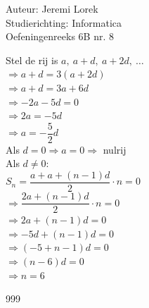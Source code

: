 \documentclass[a4paper]{article}
\begin{document}
\noindent \large Auteur: Jeremi Lorek\\
\noindent \large Studierichting: Informatica\\
\noindent \large Oefeningenreeks 6B nr. 8\\

\medskip
\normalsize

Stel de rij is $a,\ a + d,\ a + 2d,\ \dots$ \\

$\Rightarrow a + d = 3(a + 2d)$ \\

$\Rightarrow a + d = 3a + 6d$ \\

$\Rightarrow -2a - 5d = 0$ \\

$\Rightarrow 2a = -5d$ \\

$\Rightarrow a = -\dfrac{5}{2}d$ \\

Als $d = 0 \Rightarrow a = 0 \Rightarrow$ nulrij \\

Als $d \neq 0:$ \\

$S_n = \dfrac{a + a + (n-1)d}{2} \cdot n = 0 $ \\

$\Rightarrow \dfrac{2a + (n-1)d}{2} \cdot n = 0$ \\

$\Rightarrow 2a + (n - 1)d = 0$ \\

$\Rightarrow -5d + (n - 1)d = 0$ \\

$\Rightarrow (-5 + n - 1)d = 0$ \\

$\Rightarrow (n - 6)d = 0$ \\

$\Rightarrow n = 6$

\begin{thebibliography}{999}
\end{thebibliography}
\end{document}
